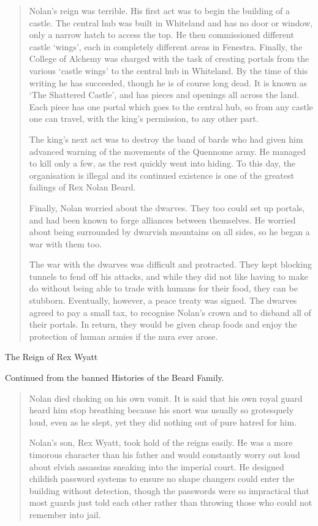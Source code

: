 \begin{multicols}{2}
\begin{quotation}
	Nolan's reign was terrible.  His first act was to begin the building of a castle.  The central hub was built in Whiteland and has no door or window, only a narrow hatch to access the top.  He then commissioned different castle `wings', each in completely different areas in Fenestra.  Finally, the College of Alchemy was charged with the task of creating portals from the various `castle wings' to the central hub in Whiteland.  By the time of this writing he has succeeded, though he is of course long dead.  It is known as `The Shattered Castle', and has pieces and openings all across the land.  Each piece has one portal which goes to the central hub, so from any castle one can travel, with the king's permission, to any other part.

	The king's next act was to destroy the band of bards who had given him advanced warning of the movements of the Quennome army.  He managed to kill only a few, as the rest quickly went into hiding.  To this day, the organisation is illegal and its continued existence is one of the greatest failings of Rex Nolan Beard.

	Finally, Nolan worried about the dwarves.  They too could set up portals, and had been known to forge alliances between themselves.  He worried about being surrounded by dwarvish mountains on all sides, so he began a war with them too.

	The war with the dwarves was difficult and protracted.  They kept blocking tunnels to fend off his attacks, and while they did not like having to make do without being able to trade with humans for their food, they can be stubborn.  Eventually, however,  a peace treaty was signed.  The dwarves agreed to pay a small tax, to recognise Nolan's crown and to disband all of their portals.  In return, they would be given cheap foods and enjoy the protection of human armies if the nura ever arose.

\end{quotation}

The Reign of Rex Wyatt

Continued from the banned Histories of the Beard Family.

\begin{quotation}

	Nolan died choking on his own vomit.  It is said that his own royal guard heard him stop breathing because his snort was usually so grotesquely loud, even as he slept, yet they did nothing out of pure hatred for him.

	Nolan's son, Rex Wyatt, took hold of the reigns easily.  He was a more timorous character than his father and would constantly worry out loud about elvish assassins sneaking into the imperial court.  He designed childish password systems to ensure no shape changers could enter the building without detection, though the passwords were so impractical that most guards just told each other rather than throwing those who could not remember into jail.


\end{quotation}
\end{multicols}
